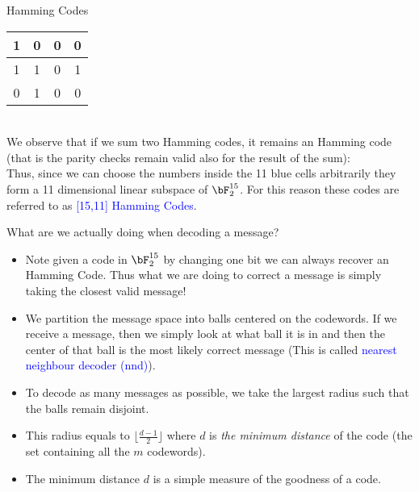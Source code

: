 \begin{frame}{Hamming Codes}
\begin{minipage}{0.25\textwidth}
\begin{tabular}{|c|c|c|c|}
            \cellcolor{red!20} 1 & \cellcolor{blue!20} 0 & \cellcolor{blue!20}  0 & \cellcolor{blue!20} 0  \\ \hline
            \cellcolor{red!20} 1 & \cellcolor{blue!20} 1 &\cellcolor{blue!20}  0 &\cellcolor{blue!20} 1  \\ \hline
             \rowcolor{blue!20}0 & 1 & 0 & 0  \\ \hline
        \end{tabular}
    \end{minipage} \\
\bigskip \pause
We observe that if we sum two Hamming codes, it remains an Hamming code (that is the parity checks remain valid also for the result of the sum): \\
\pause
     Thus, since we can choose the numbers inside the 11 blue cells arbitrarily they form a 11 dimensional linear subspace of $\bF_2^{15}$.  For this reason these codes are referred to as \textcolor{blue}{[15,11] Hamming Codes}.
     
\end{frame}

\begin{frame}{What are we actually doing when decoding a message?}
\begin{itemize}
    \item Note given a code in \(\bF^{15}_2\) by changing one bit we can always recover an Hamming Code. Thus what we are doing to correct a message is simply taking the closest valid message! 
    \pause
    \item We partition the message space into balls centered on the codewords. If we receive a message, then we simply look at what ball it is in and then the center of that ball is the most likely correct message (This is called \textcolor{blue}{nearest neighbour decoder (nnd)}).
    \pause
    \item To decode as many messages as possible, we take the largest radius such that the balls remain disjoint. 
    \pause
    \item This radius equals to \( \lfloor \frac{d-1}{2}\rfloor\) where \(d\) is \emph{the minimum distance} of the code (the set containing all the \(m\) codewords).
    \pause
    \item The minimum distance \(d\) is a simple measure of the goodness of a code.
    
    
   

    
\end{itemize}

\end{frame}

